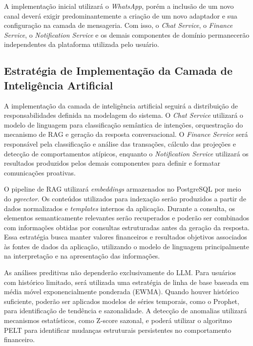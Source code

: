 A implementação inicial utilizará o \textit{WhatsApp}, porém a inclusão de um novo canal deverá exigir predominantemente a criação de um novo adaptador e sua configuração na camada de mensageria. Com isso, o \textit{Chat Service}, o \textit{Finance Service}, o \textit{Notification Service} e os demais componentes de domínio permanecerão independentes da plataforma utilizada pelo usuário.

\subsection{Estratégia de Implementação da Camada de Inteligência Artificial}

A implementação da camada de inteligência artificial seguirá a distribuição de responsabilidades definida na modelagem do sistema. O \textit{Chat Service} utilizará o modelo de linguagem para classificação semântica de intenções, orquestração do mecanismo de RAG e geração da resposta conversacional. O \textit{Finance Service} será responsável pela classificação e análise das transações, cálculo das projeções e detecção de comportamentos atípicos, enquanto o \textit{Notification Service} utilizará os resultados produzidos pelos demais componentes para definir e formatar comunicações proativas.

O pipeline de RAG utilizará \textit{embeddings} armazenados no PostgreSQL por meio do \textit{pgvector}. Os conteúdos utilizados para indexação serão produzidos a partir de dados normalizados e \textit{templates} internos da aplicação. Durante a consulta, os elementos semanticamente relevantes serão recuperados e poderão ser combinados com informações obtidas por consultas estruturadas antes da geração da resposta. Essa estratégia busca manter valores financeiros e resultados objetivos associados às fontes de dados da aplicação, utilizando o modelo de linguagem principalmente na interpretação e na apresentação das informações.

As análises preditivas não dependerão exclusivamente do LLM. Para usuários com histórico limitado, será utilizada uma estratégia de linha de base baseada em média móvel exponencialmente ponderada (EWMA). Quando houver histórico suficiente, poderão ser aplicados modelos de séries temporais, como o Prophet, para identificação de tendência e sazonalidade. A detecção de anomalias utilizará mecanismos estatísticos, como Z-score sazonal, e poderá utilizar o algoritmo PELT para identificar mudanças estruturais persistentes no comportamento financeiro.

